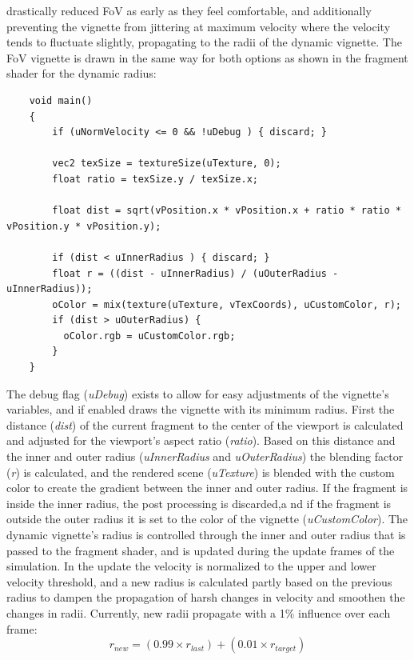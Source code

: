 drastically reduced FoV as early as they feel comfortable, and additionally preventing the vignette from jittering
at maximum velocity where the velocity tends to fluctuate slightly, propagating to the radii of the dynamic vignette.
The FoV vignette is drawn in the same way for both options as shown in the fragment shader for the dynamic radius:
\begin{verbatim}
    void main()
    {
        if (uNormVelocity <= 0 && !uDebug ) { discard; }

        vec2 texSize = textureSize(uTexture, 0);
        float ratio = texSize.y / texSize.x;

        float dist = sqrt(vPosition.x * vPosition.x + ratio * ratio * vPosition.y * vPosition.y);

        if (dist < uInnerRadius ) { discard; }
        float r = ((dist - uInnerRadius) / (uOuterRadius - uInnerRadius));
        oColor = mix(texture(uTexture, vTexCoords), uCustomColor, r);
        if (dist > uOuterRadius) {
          oColor.rgb = uCustomColor.rgb;
        }
    }
\end{verbatim}
The debug flag (\textit{uDebug}) exists to allow for easy adjustments of the vignette's variables, and if enabled
draws the vignette with its minimum radius.
First the distance (\textit{dist}) of the current fragment to the center of the viewport is calculated and adjusted
for the viewport's aspect ratio (\textit{ratio}).
Based on this distance and the inner and outer radius (\textit{uInnerRadius} and \textit{uOuterRadius}) the blending
factor (\textit{r}) is calculated, and the rendered scene (\textit{uTexture}) is blended with the custom color to
create the gradient between the inner and outer radius.
If the fragment is inside the inner radius, the post processing is discarded,a nd if the fragment is outside the
outer radius it is set to the color of the vignette (\textit{uCustomColor}).
The dynamic vignette's radius is controlled through the inner and outer radius that is passed to the fragment shader,
and is updated during the update frames of the simulation.
In the update the velocity is normalized to the upper and lower velocity threshold, and a new radius is calculated
partly based on the previous radius to dampen the propagation of harsh changes in velocity and smoothen the changes
in radii.
Currently, new radii propagate with a 1\% influence over each frame:
\begin{equation}
    \label{eq:radii-influence}
    r_{new} = ( 0.99 \times r_{last} ) + ( 0.01 \times r_{target} )
\end{equation}

